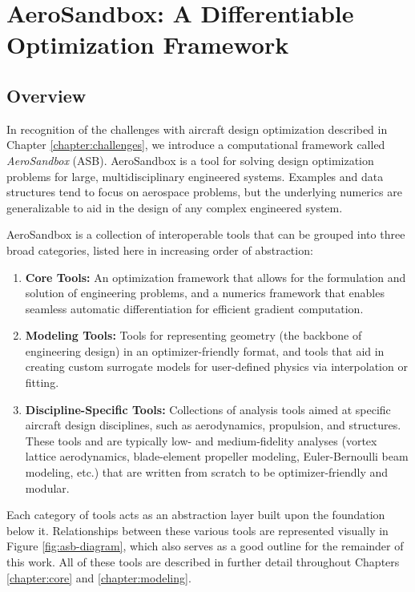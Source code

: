 \chapter{AeroSandbox: A Differentiable Optimization Framework}
\label{chapter:aerosandbox}


\section{Overview}

In recognition of the challenges with aircraft design optimization described in Chapter \ref{chapter:challenges}, we introduce a computational framework called \textit{AeroSandbox} (ASB). AeroSandbox is a tool for solving design optimization problems for large, multidisciplinary engineered systems. Examples and data structures tend to focus on aerospace problems, but the underlying numerics are generalizable to aid in the design of any complex engineered system.

AeroSandbox is a collection of interoperable tools that can be grouped into three broad categories, listed here in increasing order of abstraction:

\begin{enumerate}
    \item \textbf{Core Tools:} An optimization framework that allows for the formulation and solution of engineering problems, and a numerics framework that enables seamless automatic differentiation for efficient gradient computation.

    \item \textbf{Modeling Tools:} Tools for representing geometry (the backbone of engineering design) in an optimizer-friendly format, and tools that aid in creating custom surrogate models for user-defined physics via interpolation or fitting.

    \item \textbf{Discipline-Specific Tools:} Collections of analysis tools aimed at specific aircraft design disciplines, such as aerodynamics, propulsion, and structures. These tools and are typically low- and medium-fidelity analyses (vortex lattice aerodynamics, blade-element propeller modeling, Euler-Bernoulli beam modeling, etc.) that are written from scratch to be optimizer-friendly and modular.

\end{enumerate}

Each category of tools acts as an abstraction layer built upon the foundation below it. Relationships between these various tools are represented visually in Figure \ref{fig:asb-diagram}, which also serves as a good outline for the remainder of this work. All of these tools are described in further detail throughout Chapters \ref{chapter:core} and \ref{chapter:modeling}. %

